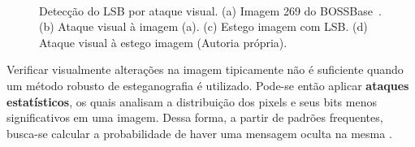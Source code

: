 \begin{figure}[ht]
\centering
	\qquad
	\\ 
	\qquad

	\caption{Detecção do LSB por ataque visual. (a) Imagem 269 do BOSSBase~\cite{bas2011break}. (b) Ataque visual à imagem (a). (c) Estego imagem com LSB. (d) Ataque visual à estego imagem (Autoria própria).}
\label{fig:visualattack}
\end{figure}

Verificar visualmente alterações na imagem tipicamente não é suficiente quando um método robusto de esteganografia é utilizado. Pode-se então aplicar \textbf{ataques estatísticos}, os quais analisam a distribuição dos pixels e seus bits menos significativos em uma imagem. Dessa forma, a partir de padrões frequentes, busca-se calcular a probabilidade de haver uma mensagem oculta na mesma \cite{fridrich2002practical}.

